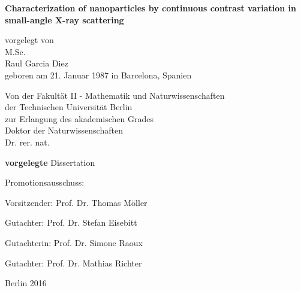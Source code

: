 
\begin{titlepage}
{\noindent\sffamily\large%
    \begin{center}
        \vspace*{3ex}
        {\LARGE\bfseries\sffamily
            Characterization of nanoparticles by continuous contrast variation in small-angle X-ray scattering
        }
        \vspace{1cm}

        vorgelegt von \\
        M.Sc. \\
        Raul Garcia Diez \\
        geboren am 21. Januar 1987 in Barcelona, Spanien \\
        \vspace{4cm}

        Von der Fakultät II - Mathematik und Naturwissenschaften \\
        der Technischen Universität Berlin \\
        zur Erlangung des akademischen Grades \\
        Doktor der Naturwissenschaften \\
        Dr. rer. nat. \\
        \vspace{3ex}

        \textbf{vorgelegte} Dissertation \\
        \vspace{2cm}
    \end{center}

    Promotionsausschuss:
    \vspace{2ex}

    Vorsitzender: Prof. Dr. Thomas Möller

    Gutachter: Prof. Dr. Stefan Eisebitt

    Gutachterin: Prof. Dr. Simone Raoux

    Gutachter: Prof. Dr. Mathias Richter
    \vspace{1ex}


    \vfill
    \begin{center}
        Berlin 2016
    \end{center}
}
\end{titlepage}

\cleardoublepage

